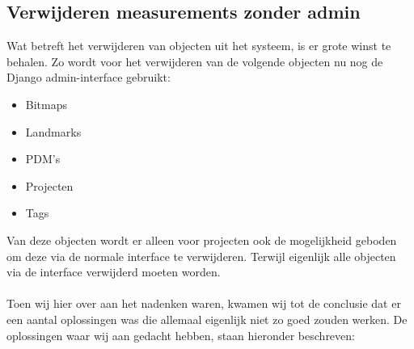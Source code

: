 \subsection{Verwijderen measurements zonder admin}
Wat betreft het verwijderen van objecten uit het systeem, is er grote winst te behalen.
Zo wordt voor het verwijderen van de volgende objecten nu nog de Django admin-interface gebruikt:
\begin{itemize}
  \item Bitmaps
  \item Landmarks
  \item PDM's
  \item Projecten
  \item Tags
\end{itemize}
Van deze objecten wordt er alleen voor projecten ook de mogelijkheid geboden om deze via de normale interface te verwijderen. 
Terwijl eigenlijk alle objecten via de interface verwijderd moeten worden.
\\
\\
Toen wij hier over aan het nadenken waren, kwamen wij tot de conclusie dat er een aantal oplossingen was die allemaal eigenlijk niet zo goed zouden werken.
De oplossingen waar wij aan gedacht hebben, staan hieronder beschreven:
\\

